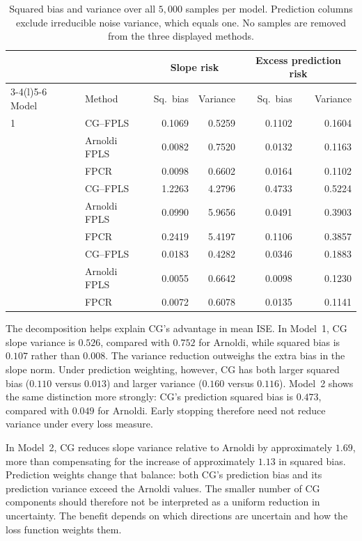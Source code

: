 \begin{table}[htbp]
    \centering
    \small
    \caption[Bias and variance across all simulation samples]{Squared bias
    and variance over all $5{,}000$ samples per model. Prediction columns
    exclude irreducible noise variance, which equals one. No samples are
    removed from the three displayed methods.}
    \label{main:tab:simulation-bias-variance}
    \begin{tabular}{@{}llrrrr@{}}
        \toprule
        & & \multicolumn{2}{c}{Slope risk}
          & \multicolumn{2}{c}{Excess prediction risk}\\
        \cmidrule(lr){3-4}\cmidrule(l){5-6}
        Model & Method & Sq.\ bias & Variance & Sq.\ bias & Variance\\
        \midrule
        1 & CG--FPLS     & 0.1069 & 0.5259 & 0.1102 & 0.1604\\
          & Arnoldi FPLS & 0.0082 & 0.7520 & 0.0132 & 0.1163\\
          & FPCR         & 0.0098 & 0.6602 & 0.0164 & 0.1102\\
        \addlinespace
        2 & CG--FPLS     & 1.2263 & 4.2796 & 0.4733 & 0.5224\\
          & Arnoldi FPLS & 0.0990 & 5.9656 & 0.0491 & 0.3903\\
          & FPCR         & 0.2419 & 5.4197 & 0.1106 & 0.3857\\
        \addlinespace
        3 & CG--FPLS     & 0.0183 & 0.4282 & 0.0346 & 0.1883\\
          & Arnoldi FPLS & 0.0055 & 0.6642 & 0.0098 & 0.1230\\
          & FPCR         & 0.0072 & 0.6078 & 0.0135 & 0.1141\\
        \bottomrule
    \end{tabular}
\end{table}

The decomposition helps explain CG's advantage in mean ISE.
In Model~1, CG slope variance
is $0.526$, compared with $0.752$ for Arnoldi, while squared bias is
$0.107$ rather than $0.008$. The variance reduction outweighs the extra
bias in the slope norm. Under prediction weighting, however, CG has both
larger squared bias ($0.110$ versus $0.013$) and larger variance
($0.160$ versus $0.116$). Model~2 shows the same distinction more strongly:
CG's prediction squared bias is $0.473$, compared with $0.049$ for
Arnoldi. Early stopping therefore need not reduce variance under every
loss measure.

In Model~2, CG reduces slope variance relative to Arnoldi by approximately
$1.69$, more than compensating for the increase of approximately $1.13$
in squared bias. Prediction weights change that balance: both CG's
prediction bias and its prediction variance exceed the Arnoldi values.
The smaller number of CG components should therefore not be interpreted
as a uniform reduction in uncertainty. The benefit depends on which
directions are uncertain and how the loss function weights them.

